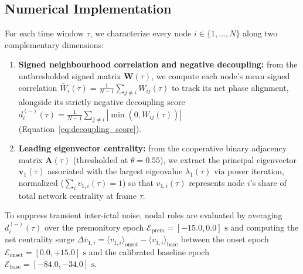\subsection{Numerical Implementation}
For each time window $\tau$, we characterize every node $i \in \{1, \dots, N\}$ along two complementary dimensions:
\begin{enumerate}
    \item \textbf{Signed neighbourhood correlation and negative decoupling:} from the unthresholded signed matrix $\mathbf{W}(\tau)$, we compute each node's mean signed correlation $\bar{W}_i(\tau) = \frac{1}{N-1}\sum_{j \neq i} W_{ij}(\tau)$ to track its net phase alignment, alongside its strictly negative decoupling score $d_i^{(-)}(\tau) = \frac{1}{N-1}\sum_{j \neq i} |\min(0, W_{ij}(\tau))|$ (Equation~\ref{eq:decoupling_score}).
    \item \textbf{Leading eigenvector centrality:} from the cooperative binary adjacency matrix $\mathbf{A}(\tau)$ (thresholded at $\theta = 0.55$), we extract the principal eigenvector $\mathbf{v}_1(\tau)$ associated with the largest eigenvalue $\lambda_1(\tau)$ via power iteration, normalized ($\sum_i v_{1,i}(\tau) = 1$) so that $v_{1,i}(\tau)$ represents node $i$'s share of total network centrality at frame $\tau$.
\end{enumerate}
To suppress transient inter-ictal noise, nodal roles are evaluated by averaging $d_i^{(-)}(\tau)$ over the premonitory epoch $\mathcal{E}_{\text{prem}} = [-15.0, 0.0]\text{ s}$ and computing the net centrality surge $\Delta \bar{v}_{1,i} = \langle v_{1,i} \rangle_{\text{onset}} - \langle v_{1,i} \rangle_{\text{base}}$ between the onset epoch $\mathcal{E}_{\text{onset}} = [0.0, +15.0]\text{ s}$ and the calibrated baseline epoch $\mathcal{E}_{\text{base}} = [-84.0, -34.0]\text{ s}$.

